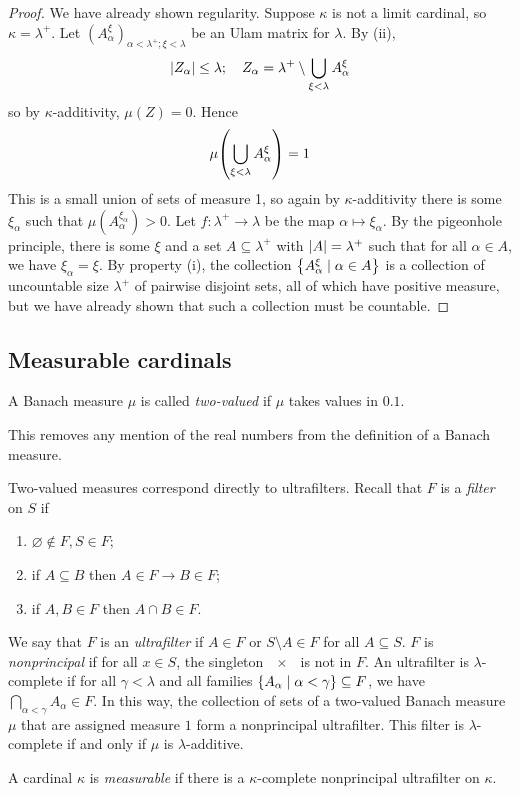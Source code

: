 \begin{proof}
    We have already shown regularity.
    Suppose \( \kappa \) is not a limit cardinal, so \( \kappa = \lambda^+ \).
    Let \( (A_\alpha^\xi)_{\alpha < \lambda^+; \xi < \lambda} \) be an Ulam matrix for \( \lambda \).
    By (ii),
    \[ \abs{Z_\alpha} \leq \lambda;\quad Z_\alpha = \lambda^+ \setminus \bigcup_{\xi < \lambda} A_\alpha^\xi \]
    so by \( \kappa \)-additivity, \( \mu(Z) = 0 \).
    Hence
    \[ \mu\qty(\bigcup_{\xi < \lambda} A_\alpha^\xi) = 1 \]
    This is a small union of sets of measure 1, so again by \( \kappa \)-additivity there is some \( \xi_\alpha \) such that \( \mu(A_\alpha^{\xi_\alpha}) > 0 \).
    Let \( f : \lambda^+ \to \lambda \) be the map \( \alpha \mapsto \xi_\alpha \).
    By the pigeonhole principle, there is some \( \xi \) and a set \( A \subseteq \lambda^+ \) with \( \abs{A} = \lambda^+ \) such that for all \( \alpha \in A \), we have \( \xi_\alpha = \xi \).
    By property (i), the collection \( \qty{A_\alpha^\xi \mid \alpha \in A} \) is a collection of uncountable size \( \lambda^+ \) of pairwise disjoint sets, all of which have positive measure, but we have already shown that such a collection must be countable.
\end{proof}

\subsection{Measurable cardinals}
\begin{definition}
    A Banach measure \( \mu \) is called \emph{two-valued} if \( \mu \) takes values in \( \qty{0,1} \).
\end{definition}
This removes any mention of the real numbers from the definition of a Banach measure.
\begin{remark}
    Two-valued measures correspond directly to ultrafilters.
    Recall that \( F \) is a \emph{filter} on \( S \) if
    \begin{enumerate}
        \item \( \varnothing \notin F, S \in F \);
        \item if \( A \subseteq B \) then \( A \in F \to B \in F \);
        \item if \( A, B \in F \) then \( A \cap B \in F \).
    \end{enumerate}
    We say that \( F \) is an \emph{ultrafilter} if \( A \in F \) or \( S \setminus A \in F \) for all \( A \subseteq S \).
    \( F \) is \emph{nonprincipal} if for all \( x \in S \), the singleton \( \qty{x} \) is not in \( F \).
    An ultrafilter is \( \lambda \)-complete if for all \( \gamma < \lambda \) and all families \( \qty{A_\alpha \mid \alpha < \gamma} \subseteq F \), we have \( \bigcap_{\alpha < \gamma} A_\alpha \in F \).
    In this way, the collection of sets of a two-valued Banach measure \( \mu \) that are assigned measure \( 1 \) form a nonprincipal ultrafilter.
    This filter is \( \lambda \)-complete if and only if \( \mu \) is \( \lambda \)-additive.
\end{remark}
\begin{definition}
    A cardinal \( \kappa \) is \emph{measurable} if there is a \( \kappa \)-complete nonprincipal ultrafilter on \( \kappa \).
\end{definition}
